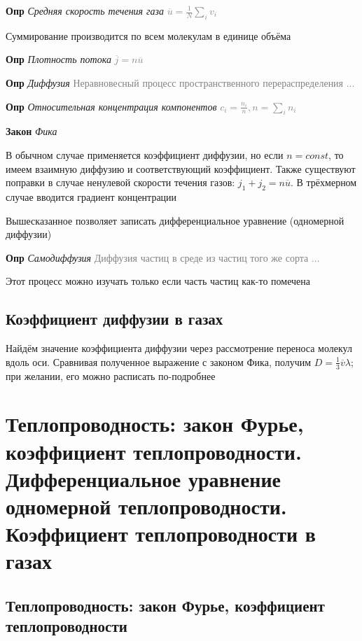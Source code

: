 \documentclass[a4paper, 14pt]{article}
\begin{document}
    \textbf{Опр} \textit{Средняя скорость течения газа} \textcolor{gray}{$\overline{u} = \frac{1}{N} \sum_i v_i$}
    
    Суммирование производится по всем молекулам в единице объёма
    
    \textbf{Опр} \textit{Плотность потока} \textcolor{gray}{$\overline{j} = n\overline{u}$}
    
    \textbf{Опр} \textit{Диффузия} \textcolor{gray}{Неравновесный процесс пространственного перераспределения ...}
    
    \textbf{Опр} \textit{Относительная концентрация компонентов} \textcolor{gray}{$c_i = \frac{n_i}{n}, n = \sum_i n_i$}
    
    \textbf{Закон} \textit{Фика}
    
    В обычном случае применяется коэффициент диффузии, но если $n = const$, то имеем взаимную диффузию и
    соответствующий коэффициент.
    Также существуют поправки в случае ненулевой скорости течения газов: $j_1 + j_2 = n \overline{u}$.
    В трёхмерном случае вводится градиент концентрации
    
    Вышесказанное позволяет записать дифференциальное уравнение (одномерной диффузии)
    
    \textbf{Опр} \textit{Самодиффузия} \textcolor{gray}{Диффузия частиц в среде из частиц того же сорта ...}
    
    Этот процесс можно изучать только если часть частиц как-то помечена
    
    \subsection{Коэффициент диффузии в газах}
    
    Найдём значение коэффициента диффузии через рассмотрение переноса молекул вдоль оси.
    Сравнивая полученное выражение с законом Фика, получим $D = \frac{1}{3} \overline{v}\lambda$; при
    желании, его можно расписать по-подробнее
    
    \section{Теплопроводность: закон Фурье, коэффициент теплопроводности. Дифференциальное уравнение одномерной
    теплопроводности.
    Коэффициент теплопроводности в газах}
    
    \subsection{Теплопроводность: закон Фурье, коэффициент теплопроводности}
    
\end{document}
